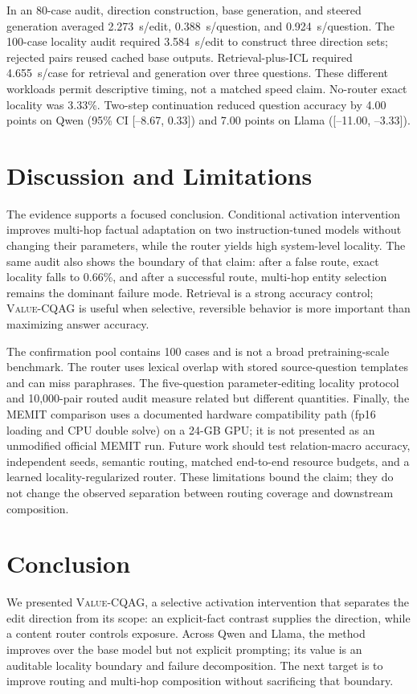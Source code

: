 \documentclass{article}
\newcommand{\method}{\textsc{Value-CQAG}}
\newcommand{\memit}{\textsc{MEMIT}}
\begin{document}
In an 80-case audit, direction construction, base generation, and steered generation averaged 2.273~s/edit, 0.388~s/question, and 0.924~s/question. The 100-case locality audit required 3.584~s/edit to construct three direction sets; rejected pairs reused cached base outputs. Retrieval-plus-ICL required 4.655~s/case for retrieval and generation over three questions. These different workloads permit descriptive timing, not a matched speed claim. No-router exact locality was 3.33\%. Two-step continuation reduced question accuracy by 4.00 points on Qwen (95\% CI [--8.67, 0.33]) and 7.00 points on Llama ([--11.00, --3.33]).

\section{Discussion and Limitations}
The evidence supports a focused conclusion. Conditional activation intervention improves multi-hop factual adaptation on two instruction-tuned models without changing their parameters, while the router yields high system-level locality. The same audit also shows the boundary of that claim: after a false route, exact locality falls to 0.66\%, and after a successful route, multi-hop entity selection remains the dominant failure mode. Retrieval is a strong accuracy control; \method{} is useful when selective, reversible behavior is more important than maximizing answer accuracy.

The confirmation pool contains 100 cases and is not a broad pretraining-scale benchmark. The router uses lexical overlap with stored source-question templates and can miss paraphrases. The five-question parameter-editing locality protocol and 10,000-pair routed audit measure related but different quantities. Finally, the \memit{} comparison uses a documented hardware compatibility path (fp16 loading and CPU double solve) on a 24-GB GPU; it is not presented as an unmodified official \memit{} run. Future work should test relation-macro accuracy, independent seeds, semantic routing, matched end-to-end resource budgets, and a learned locality-regularized router. These limitations bound the claim; they do not change the observed separation between routing coverage and downstream composition.

\section{Conclusion}
We presented \method{}, a selective activation intervention that separates the edit direction from its scope: an explicit-fact contrast supplies the direction, while a content router controls exposure. Across Qwen and Llama, the method improves over the base model but not explicit prompting; its value is an auditable locality boundary and failure decomposition. The next target is to improve routing and multi-hop composition without sacrificing that boundary.
\end{document}
